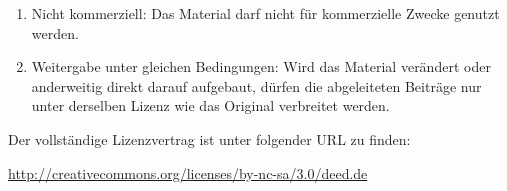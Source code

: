 \documentclass[$font_size]{$document_type}
\begin{document}
{\begin{enumerate}
\item  Nicht kommerziell: Das Material darf nicht für kommerzielle Zwecke genutzt
   werden.

\item  Weitergabe unter gleichen Bedingungen: Wird das Material verändert oder
   anderweitig direkt darauf aufgebaut, dürfen die abgeleiteten Beiträge nur
   unter derselben Lizenz wie das Original verbreitet werden.
\end{enumerate}

\noindent
Der vollständige Lizenzvertrag ist unter folgender URL zu finden:

\noindent
{}\url{http://creativecommons.org/licenses/by-nc-sa/3.0/deed.de}
}
\end{document}
